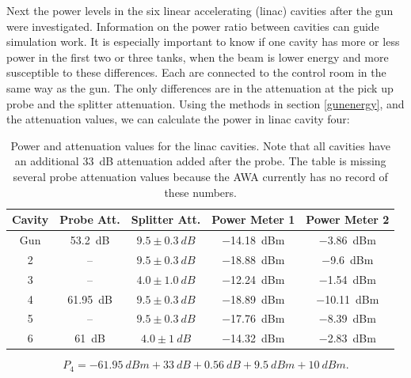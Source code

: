 Next the power levels in the six linear accelerating (linac) cavities after the gun
were investigated. Information on the power ratio between cavities can 
guide simulation work. It is especially important to know if one cavity
has more or less power in the first two or three tanks, when the beam is 
lower energy and more susceptible to these differences.
Each are connected to the control room in the same way as the gun. 
The only differences are in the attenuation at the pick up probe and 
the splitter attenuation. Using the methods in section \ref{gunenergy}, 
and the attenuation values, we can calculate the power in linac cavity four:
\begin{table} %
	\caption{\label{tab:powerlinac} Power and attenuation values for the 
		linac cavities. Note that all cavities have an additional 
		\SI{33}{dB} attenuation added after the probe.
		The table is missing several probe attenuation values because the
		AWA currently has no record of these numbers.}
	\begin{center}
		\begin{tabular}{ccccc}	
			\toprule
			\toprule
			\textbf{Cavity} & \textbf{Probe Att.} & \textbf{Splitter Att.} & \textbf{Power Meter 1}  & \textbf{Power Meter 2} \\
			\midrule
			Gun & \SI{53.2}{dB}& $9.5 \pm \SI{0.3}{dB}$ & \SI{-14.18}{dBm} & \SI{-3.86}{dBm}  \\
			2 & --       & $9.5 \pm \SI{0.3}{dB}$ & \SI{-18.88}{dBm} & \SI{-9.6}{dBm}  \\
			3 & --       & $4.0 \pm \SI{1.0}{dB}$ & \SI{-12.24}{dBm} & \SI{-1.54}{dBm}  \\
			4 & \SI{61.95}{dB} & $9.5 \pm \SI{0.3}{dB}$ & \SI{-18.89}{dBm} & \SI{-10.11}{dBm}  \\
			5 & --       & $9.5 \pm \SI{0.3}{dB}$ & \SI{-17.76}{dBm} & \SI{-8.39}{dBm}  \\
			6 & \SI{61}{dB}    & $4.0 \pm \SI{1}{dB}$  & \SI{-14.32}{dBm} & \SI{-2.83}{dBm} \\
			\bottomrule
		\end{tabular}
	\end{center}
\end{table}
\begin{equation}
P_4 = \SI{-61.95}{dBm} + \SI{33}{dB} + \SI{0.56}{dB} + \SI{9.5}{dBm} +\SI{10}{dBm}.
\end{equation}


